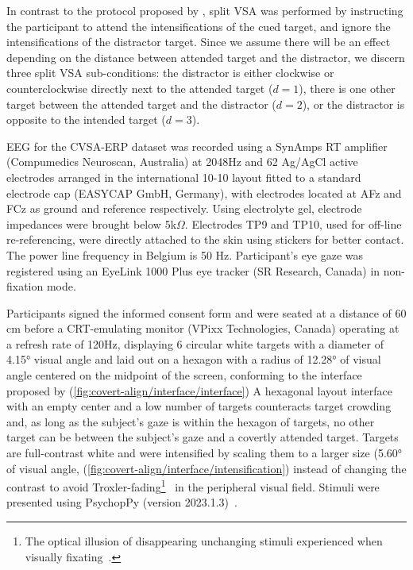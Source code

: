 In contrast to the protocol proposed by \cite{Frenzel2011}, split VSA was
performed by instructing the participant to attend the intensifications of the
cued target, and ignore the intensifications of the distractor target.
Since we assume there will be an effect depending on the distance between
attended target and the distractor, we discern three split VSA sub-conditions:
the distractor is either clockwise or counterclockwise directly next to the
attended target ($d=1$), there is one other target between the attended target and
the distractor ($d=2$), or the distractor is opposite to the intended target
($d=3$).

EEG for the CVSA-ERP dataset was recorded using a SynAmps RT amplifier
(Compumedics Neuroscan, Australia) at 2048Hz and 62 Ag/AgCl active electrodes arranged in the
international 10-10 layout fitted to a standard electrode cap (EASYCAP GmbH,
Germany), with electrodes located at AFz and FCz as ground and reference respectively.
Using electrolyte gel, electrode impedances were brought below 5k$\Omega$.
Electrodes TP9 and TP10, used for off-line re-referencing, were directly
attached to the skin using stickers for better contact.
The power line frequency in Belgium is 50 Hz.
Participant's eye gaze was registered using an EyeLink 1000 Plus eye tracker (SR Research,
Canada) in non-fixation mode.

Participants signed the informed consent form and were seated at a distance of
60 cm before a CRT-emulating monitor (VPixx
Technologies, Canada) operating at a refresh rate of 120Hz, displaying 6
circular white targets with a diameter of 4.15° visual angle and laid out on a hexagon
with a radius of 12.28° of visual angle centered on the midpoint of the screen,
conforming to the interface proposed by \textcite{Treder2010}
(\autoref{fig:covert-align/interface/interface})
A hexagonal layout interface with an empty center and a low number of targets
counteracts target crowding and, as long as the subject’s gaze is within the hexagon of
targets, no other target can be between the subject’s gaze and a covertly
attended target.
Targets are full-contrast white and were intensified by scaling them to a
larger size (5.60° of visual angle,
(\autoref{fig:covert-align/interface/intensification}) instead of changing the contrast to avoid Troxler-fading\footnote{The optical illusion of disappearing unchanging stimuli
experienced when visually fixating~\cite{Troxler1804}.}~\cite{Treder2010} in the
peripheral visual field.
Stimuli were presented using PsychopPy (version 2023.1.3)~\cite{Peirce2019}.

